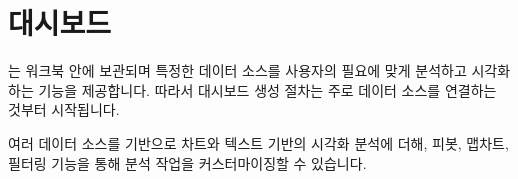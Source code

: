 \documentclass[letterpaper,10pt,english]{sphinxmanual}
\begin{document}
\section{대시보드}
\label{\detokenize{discovery/part04/manage_dashboards:id1}}\label{\detokenize{discovery/part04/manage_dashboards::doc}}
는 워크북 안에 보관되며 특정한 데이터 소스를 사용자의 필요에 맞게 분석하고 시각화하는 기능을 제공합니다. 따라서 대시보드 생성 절차는 주로 데이터 소스를 연결하는 것부터 시작됩니다.
\begin{quote}

\begin{figure}[H]
\centering

\noindent{}
\end{figure}
\end{quote}

여러 데이터 소스를 기반으로 차트와 텍스트 기반의 시각화 분석에 더해, 피봇, 맵차트, 필터링 기능을 통해 분석 작업을 커스터마이징할 수 있습니다.
\end{document}
